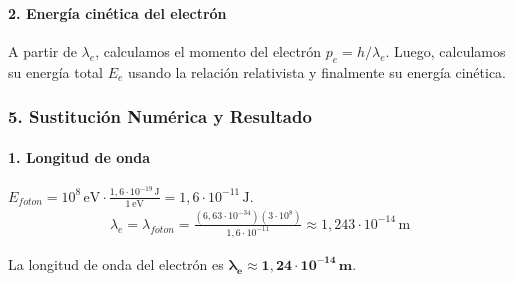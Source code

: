 \paragraph{2. Energía cinética del electrón}
A partir de $\lambda_e$, calculamos el momento del electrón $p_e = h/\lambda_e$. Luego, calculamos su energía total $E_e$ usando la relación relativista y finalmente su energía cinética.

\subsubsection*{5. Sustitución Numérica y Resultado}
\paragraph{1. Longitud de onda}
$E_{foton} = 10^8 \, \text{eV} \cdot \frac{1,6 \cdot 10^{-19} \, \text{J}}{1 \, \text{eV}} = 1,6 \cdot 10^{-11} \, \text{J}$.
\begin{gather}
    \lambda_e = \lambda_{foton} = \frac{(6,63 \cdot 10^{-34})(3 \cdot 10^8)}{1,6 \cdot 10^{-11}} \approx 1,243 \cdot 10^{-14} \, \text{m}
\end{gather}
\begin{cajaresultado}
    La longitud de onda del electrón es $\boldsymbol{\lambda_e \approx 1,24 \cdot 10^{-14} \, \textbf{m}}$.
\end{cajaresultado}
